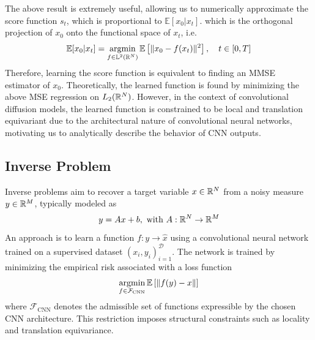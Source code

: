 \documentclass[a4paper,10pt]{article}
\begin{document}
The above result is extremely useful, allowing us to numerically approximate the score function $s_t$, which is proportional to $\mathbb{E}[x_0 | x_t]$. which is the orthogonal projection of $x_0$ onto the functional space of $x_t$, i.e. 
\[
\mathbb{E}[x_0 | x_t] = \operatorname*{argmin}_{f \in \mathbb{L}^2(\mathbb{R}^N)} \mathbb{E}\left[ \| x_0 - f(x_t) \|^2 \right], \quad t \in [0,T]
\]
Therefore, learning the score function is equivalent to finding an MMSE estimator of $x_0$. Theoretically, the learned function is found by minimizing the above MSE regression on $L_2(\mathbb{R}^N)$. However, in the context of convolutional diffusion models, the learned function is constrained to be local and translation equivariant due to the architectural nature of convolutional neural networks, motivating us to analytically describe the behavior of CNN outputs.


\subsection{Inverse Problem}
Inverse problems aim to recover a target variable $x \in \mathbb{R}^N$ from a noisy measure $y \in \mathbb{R}^M$, typically modeled as
\begin{equation*}
    y = Ax +b, \text{ with } A:\mathbb{R}^N \rightarrow \mathbb{R}^M
\end{equation*}
An approach is to learn a function $f : y \rightarrow \hat{x}$ using a convolutional neural network trained on a supervised dataset ${(x_i,y_i)}_{i=1}^\mathcal{D}$. The network is trained by minimizing the empirical risk associated with a loss function
\begin{equation*}
    \operatorname*{argmin}_{f\in \mathcal{F}_{\text{CNN}}} \mathbb{E} \left[ {\left\| f(y)-x \right \|} \right]
\end{equation*}
where $\mathcal{F}_{\text{CNN}}$ denotes the admissible set of functions expressible by the chosen CNN architecture. This restriction imposes structural constraints such as locality and translation equivariance.
\end{document}
